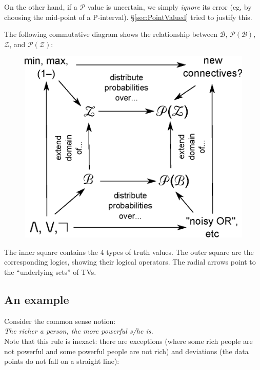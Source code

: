 On the other hand, if a $\mathcal{P}$ value is uncertain, we simply \textit{ignore} its error (eg, by choosing the mid-point of a P-interval).  \S\ref{sec:PointValued} tried to justify this.

The following commutative diagram shows the relationship between $\mathcal{B}$, $\mathcal{P(B)}$, $\mathcal{Z}$, and $\mathcal{P(Z)}$:

\begin{figure}[H]
\centering
\includegraphics[scale=0.8]{P(Z)-commutative-diagram.eps}
\end{figure}

The inner square contains the 4 types of truth values.  The outer square are the corresponding logics, showing their logical operators.  The radial arrows point to the ``underlying sets'' of TVs.

\subsection{An example}

Consider the common sense notion:\\
\hspace*{1cm} \textit{The richer a person, the more powerful s/he is.}\\
Note that this rule is inexact:  there are exceptions (where some rich people are not powerful and some powerful people are not rich) and deviations (the data points do not fall on a straight line):

